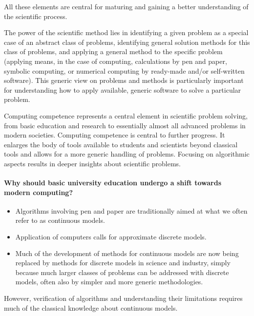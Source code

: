 \noindent
All these elements are central for maturing and gaining a better understanding of the scientific process.

The power of the scientific method lies in identifying a given problem
as a special case of an abstract class of problems, identifying
general solution methods for this class of problems, and applying a
general method to the specific problem (applying means, in the case of
computing, calculations by pen and paper, symbolic computing, or
numerical computing by ready-made and/or self-written software). This
generic view on problems and methods is particularly important for
understanding how to apply available, generic software to solve a
particular problem.

Computing competence represents a central element
in scientific problem solving, from basic education and research to
essentially almost all advanced problems in modern
societies. Computing competence is central to further
progress. It enlarges the body of tools available to students and
scientists beyond classical tools and allows for a more generic
handling of problems. Focusing on algorithmic aspects results in
deeper insights about scientific problems.





\paragraph{Why should basic university education undergo a shift towards modern computing?}
\begin{itemize}
\item Algorithms involving pen and paper are traditionally aimed at what we often refer to as continuous models.

\item Application of computers calls for approximate discrete models.

\item Much of the development of methods for continuous models are now being replaced by methods  for discrete models in science and industry, simply because much larger classes of problems can be addressed with discrete models, often also by simpler and more generic methodologies.
\end{itemize}

\noindent
However, verification of algorithms and understanding their limitations requires much of the classical knowledge about continuous models.

